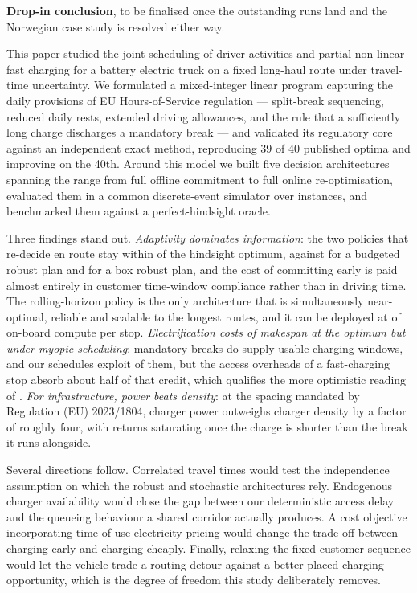\begin{anew}
\textbf{Drop-in conclusion}, to be finalised once the outstanding runs land and
the Norwegian case study is resolved either way.

\medskip
This paper studied the joint scheduling of driver activities and partial
non-linear fast charging for a battery electric truck on a fixed long-haul route
under travel-time uncertainty. We formulated a mixed-integer linear program
capturing the daily provisions of EU Hours-of-Service regulation --- split-break
sequencing, reduced daily rests, extended driving allowances, and the rule that a
sufficiently long charge discharges a mandatory break --- and validated its
regulatory core against an independent exact method, reproducing 39 of 40
published optima and improving on the 40th. Around this model we built five
decision architectures spanning the range from full offline commitment to full
online re-optimisation, evaluated them in a common discrete-event simulator over
 instances, and benchmarked them against a perfect-hindsight oracle.

\medskip
Three findings stand out. \emph{Adaptivity dominates information}: the two
policies that re-decide en route stay within  of the hindsight
optimum, against  for a budgeted robust plan and  for a box
robust plan, and the cost of committing early is paid almost entirely in customer
time-window compliance rather than in driving time. The rolling-horizon policy is
the only architecture that is simultaneously near-optimal, reliable and scalable
to the longest routes, and it can be deployed at  of on-board compute
per stop. \emph{Electrification costs  of makespan at the optimum
but  under myopic scheduling}: mandatory breaks do supply usable
charging windows, and our schedules exploit  of them, but the
access overheads of a fast-charging stop absorb about half of that credit, which
qualifies the more optimistic reading of
\citet{brockmann_break-and-charge_2025}. \emph{For infrastructure, power beats
density}: at the spacing mandated by Regulation (EU) 2023/1804, charger power
outweighs charger density by a factor of roughly four, with returns saturating
once the charge is shorter than the break it runs alongside.

\medskip
Several directions follow. Correlated travel times would test the independence
assumption on which the robust and stochastic architectures rely. Endogenous
charger availability would close the gap between our deterministic access delay
and the queueing behaviour a shared corridor actually produces. A cost objective
incorporating time-of-use electricity pricing would change the trade-off between
charging early and charging cheaply. Finally, relaxing the fixed customer
sequence would let the vehicle trade a routing detour against a better-placed
charging opportunity, which is the degree of freedom this study deliberately
removes.
\end{anew}

